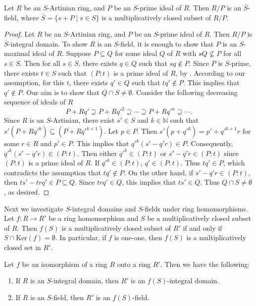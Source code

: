 \documentclass[11pt]{article}
\begin{document}
	\begin{theorem}\label{uni}
		Let $R$ be an $S$-Artinian ring, and $P$ be an $S$-prime ideal of $R$. Then $R/P$ is an $\bar{S}$-field, where $\bar{S}=\{s+P\mid s\in S\}$ is a multiplicatively closed subset of $R/P$.
	\end{theorem}
	\begin{proof}
		Let $R$ be an $S$-Artinian ring, and $P$ be an $S$-prime ideal of $R$. Then $R/P$ is $\overline{S}$-integral domain. To show $R$ is an $S$-field, it is enough to show that $P$ is an $S$-maximal ideal of $R$. Suppose $P\subseteq Q$ for some ideal $Q$ of $R$ with $sQ\nsubseteq P$ for all $s\in S$. Then for all $s\in S$, there exists $q\in Q$ such that $sq\notin P$. Since $P$ is  $S$-prime, there exists $t\in S$ such that $(P:t)$ is a prime ideal of $R$, by \cite[Proposition 1]{ah20}. According to our assumption, for this $t$, there exists $q'\in Q$ such that $tq'\notin P$. This implies that $q'\notin P$. Our aim is to show that $Q\cap S\neq\emptyset$. Consider the following decreasing sequence of ideals of $R$
		$$P+Rq'\supseteq P+Rq'^{2}\supseteq\cdots\supseteq P+Rq'^{n}\supseteq \cdots .$$
		Since $R$ is an $S$-Artinian, there exist $s'\in S$ and $k\in \mathbb{N}$ such that $s'(P+Rq'^{k})\subseteq (P+Rq'^{k+1})$. Let $p\in P$. Then $s'(p+q'^{k})=p'+q'^{k+1}r$ for some $r\in R$ and $p'\in P$. This implies that $q'^{k}(s'-q'r)\in P$. Consequently, $q'^{k}(s'-q'r)\in (P:t)$. Then either $q'^{k}\in (P:t)$ or $s'-q'r\in (P:t)$ since $(P:t)$ is a prime ideal of $R$. If $q'^{k}\in (P:t)$, $q'\in (P:t)$. Thus $tq'\in P$, which contradicts the assumption that $tq'\notin P$. On the other hand, if $s'-q'r\in (P:t)$, then $ts'-trq'\in P\subseteq Q$. Since $trq'\in Q$, this implies that $ts'\in Q$. Thus $Q\cap S\neq\emptyset$, as desired.
	\end{proof}
	Next we investigate $S$-integral domains and $S$-fields under ring homomorphisms. Let $f: R\longrightarrow R'$ be a ring homomorphism and $S$ be a multiplicatively closed subset of $R$. Then $f(S)$ is a multiplicatively closed subset of $R'$ if and only if $S\cap \text{Ker}(f)=\emptyset$. In particular, if $f$ is one-one, then $f(S)$ is a multiplicatively closed set in $R'$.
	\begin{prop}
		Let $f$ be an isomorphism of a ring $R$ onto a ring $R'$. Then we have the following:
		
		\begin{enumerate}
			\item If $R$ is an $S$-integral domain, then $R'$ is an $f(S)$-integral domain.
			\item If $R$ is an $S$-field, then $R'$ is an $f(S)$-field.
		\end{enumerate}
	\end{prop}
\end{document}

